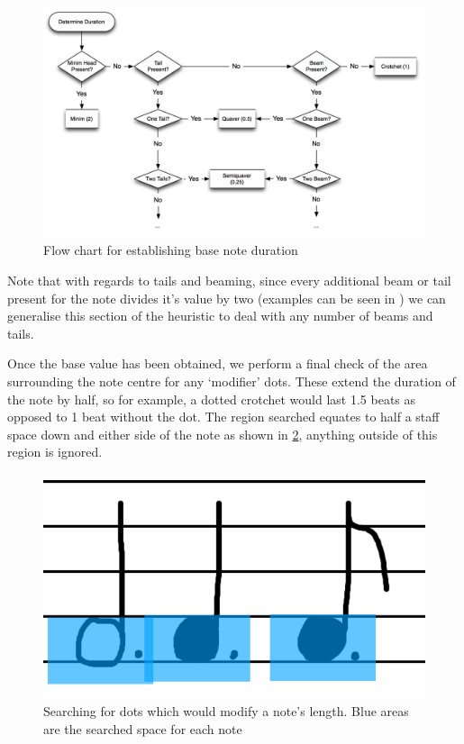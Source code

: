 \begin{figure}[H]
  \includegraphics[width=\linewidth]{gfx/implementation/duration-diagram.png}
  \caption{Flow chart for establishing base note duration}
  \label{fig:note-duration-flow-chart}
\end{figure}

Note that with regards to tails and beaming, since every additional beam or tail present for the note divides it's value by two (examples can be seen in ) we can generalise this section of the heuristic to deal with any number of beams and tails.

Once the base value has been obtained, we perform a final check of the area surrounding the note centre for any `modifier' dots. These extend the duration of the note by half, so for example, a dotted crotchet would last 1.5 beats as opposed to 1 beat without the dot. The region searched equates to half a staff space down and either side of the note as shown in \cref{fig:identify-dot}, anything outside of this region is ignored.


\begin{figure}[H]
  \includegraphics[width=\linewidth]{gfx/implementation/dot-identification.png}
  \caption{Searching for dots which would modify a note's length. Blue areas are the searched space for each note}
  \label{fig:identify-dot}
\end{figure}
